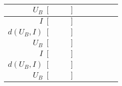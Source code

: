 \documentclass[11pt,a4paper,twoside]{article}
\begin{document}
\begin{table}[!h]
\begin{tabular}{|r|c|c|c|c|c|}
\hline
$U_B \; [\hspace{1cm}]$ & \hspace{2cm} & \hspace{2cm} & \hspace{2cm} & \hspace{2cm} & \hspace{2cm} \\
\hline
$I \; [\hspace{1cm}]$ & \hspace{2cm} & \hspace{2cm} & \hspace{2cm} & \hspace{2cm} & \hspace{2cm} \\
\hline
$d(U_B, I) \; [\hspace{1cm}]$ & \hspace{2cm} & \hspace{2cm} & \hspace{2cm} & \hspace{2cm} & \hspace{2cm} \\
\hline
\hline
$U_B \; [\hspace{1cm}]$ & \hspace{2cm} & \hspace{2cm} & \hspace{2cm} & \hspace{2cm} & \hspace{2cm} \\
\hline
$I \; [\hspace{1cm}]$ & \hspace{2cm} & \hspace{2cm} & \hspace{2cm} & \hspace{2cm} & \hspace{2cm} \\
\hline
$d(U_B, I) \; [\hspace{1cm}]$ & \hspace{2cm} & \hspace{2cm} & \hspace{2cm} & \hspace{2cm} & \hspace{2cm} \\
\hline
\hline
$U_B \; [\hspace{1cm}]$ & \hspace{2cm} & \hspace{2cm} & \hspace{2cm} & \hspace{2cm} & \hspace{2cm} \\

\end{tabular}
\end{table}
\end{document}
